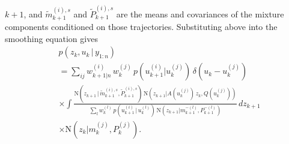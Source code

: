 \documentclass[twocolumn]{autart}    %
\begin{document}
$k+1$, and $\tilde{m}_{k+1}^{(i),s}$ and $\tilde{P}_{k+1}^{(i),s}$ are
the means and covariances of the mixture components conditioned on
those trajectories.
%
%
%
Substituting above into the smoothing equation gives
%
\begin{equation}
\begin{split}
 &p(z_{k},u_{k} \,|\, y_{1:n}) \\
 &= \sum_{ij} w^{(i)}_{k+1|n} \, w_k^{(j)} \, 
      p(u_{k+1}^{(i)} | u_k^{(j)}) \, \delta(u_{k} - u_{k}^{(j)}) \\
 &\times \int 
    \frac{\mathrm{N}(z_{k+1}\,|\,\tilde{m}_{k+1}^{(i),s},\tilde{P}_{k+1}^{(i),s}) \,
          \mathrm{N}(z_{k+1} | A(u_k^{(j)}) \, z_k, Q(u_k^{(j)}))}
        {\sum_l w_k^{(l)} \, p(u_{k+1}^{(i)}\,|\,u_k^{(l)}) \,
          \mathrm{N}(z_{k+1} | m^{-(l)}_{k+1}, P^{-(l)}_{k+1})} \, dz_{k+1} \\
  &\times \mathrm{N}(z_{k} | m^{(j)}_{k}, P^{(j)}_{k}).
\end{split}
\end{equation}
\end{document}
